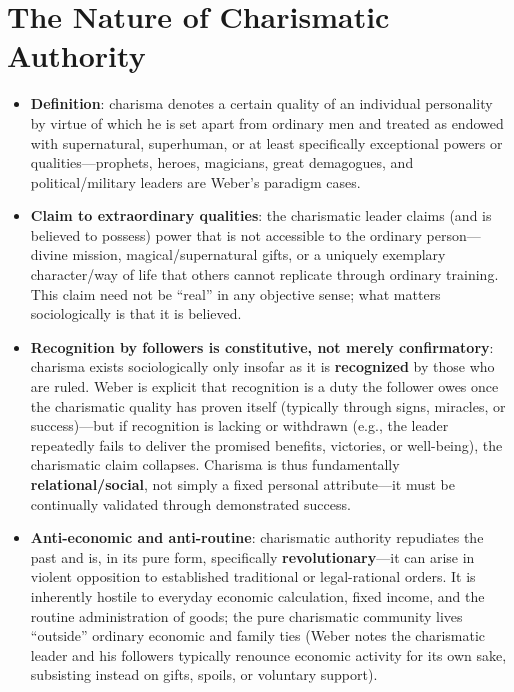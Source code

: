 \documentclass[12pt]{article}
\begin{document}
\section{The Nature of Charismatic Authority}

\begin{itemize}[leftmargin=*, itemsep=4pt]
    \item \textbf{Definition}: charisma denotes a certain quality of an individual personality by virtue of which he is set apart from ordinary men and treated as endowed with supernatural, superhuman, or at least specifically exceptional powers or qualities---prophets, heroes, magicians, great demagogues, and political/military leaders are Weber's paradigm cases.
    \item \textbf{Claim to extraordinary qualities}: the charismatic leader claims (and is believed to possess) power that is not accessible to the ordinary person---divine mission, magical/supernatural gifts, or a uniquely exemplary character/way of life that others cannot replicate through ordinary training. This claim need not be ``real'' in any objective sense; what matters sociologically is that it is believed.
    \item \textbf{Recognition by followers is constitutive, not merely confirmatory}: charisma exists sociologically only insofar as it is \textbf{recognized} by those who are ruled. Weber is explicit that recognition is a duty the follower owes once the charismatic quality has proven itself (typically through signs, miracles, or success)---but if recognition is lacking or withdrawn (e.g., the leader repeatedly fails to deliver the promised benefits, victories, or well-being), the charismatic claim collapses. Charisma is thus fundamentally \textbf{relational/social}, not simply a fixed personal attribute---it must be continually validated through demonstrated success.
    \item \textbf{Anti-economic and anti-routine}: charismatic authority repudiates the past and is, in its pure form, specifically \textbf{revolutionary}---it can arise in violent opposition to established traditional or legal-rational orders. It is inherently hostile to everyday economic calculation, fixed income, and the routine administration of goods; the pure charismatic community lives ``outside'' ordinary economic and family ties (Weber notes the charismatic leader and his followers typically renounce economic activity for its own sake, subsisting instead on gifts, spoils, or voluntary support).

\end{itemize}
\end{document}
